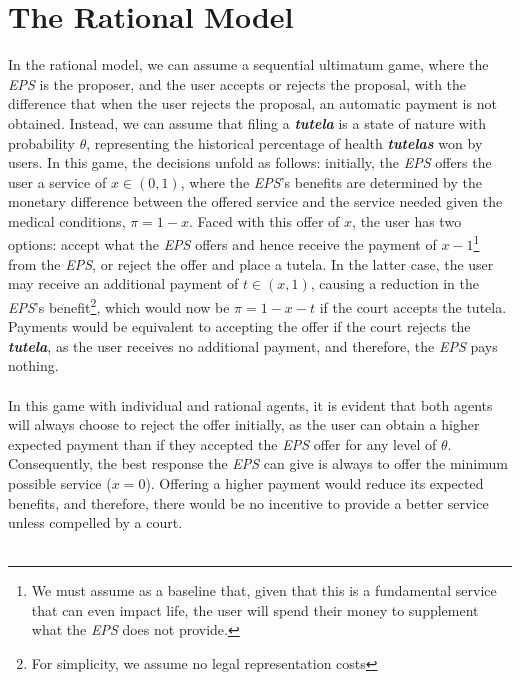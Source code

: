 \documentclass[12pt]{article}
\begin{document}
\section{The Rational Model}

\begin{flushleft}

    In the rational model, we can assume a sequential ultimatum game, where the \textit{EPS} is the proposer, and the user accepts or rejects the proposal, with the difference that when the user rejects the proposal, an automatic payment is not obtained. Instead, we can assume that filing a \textit{\textbf{tutela}} is a state of nature with probability $\theta$, representing the historical percentage of health \textit{\textbf{tutelas}} won by users. In this game, the decisions unfold as follows: initially, the \textit{EPS} offers the user a service of $x\in(0,1)$, where the \textit{EPS}'s benefits are determined by the monetary difference between the offered service and the service needed given the medical conditions, $\pi=1-x$. Faced with this offer of $x$, the user has two options: accept what the \textit{EPS} offers and hence receive the payment of $x-1$\footnote{We must assume as a baseline that, given that this is a fundamental service that can even impact life, the user will spend their money to supplement what the \textit{EPS} does not provide.} from the \textit{EPS}, or reject the offer and place a tutela. In the latter case, the user may receive an additional payment of $t\in(x,1)$, causing a reduction in the \textit{EPS}'s benefit\footnote{For simplicity, we assume no legal representation costs}, which would now be $\pi=1-x-t$ if the court accepts the tutela. Payments would be equivalent to accepting the offer if the court rejects the \textit{\textbf{tutela}}, as the user receives no additional payment, and therefore, the \textit{EPS} pays nothing.\\~\\

    In this game with individual and rational agents, it is evident that both agents will always choose to reject the offer initially, as the user can obtain a higher expected payment than if they accepted the \textit{EPS} offer for any level of $\theta$. Consequently, the best response the \textit{EPS} can give is always to offer the minimum possible service ($x=0$). Offering a higher payment would reduce its expected benefits, and therefore, there would be no incentive to provide a better service unless compelled by a court.\\~\\


\end{flushleft}
\end{document}
